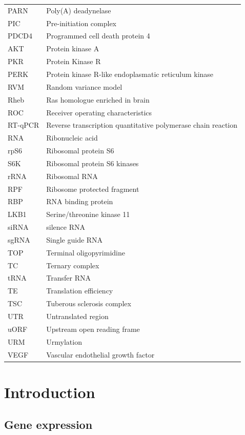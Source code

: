\documentclass[
  12pt,
  openany]{book}
\begin{document}
\begin{longtable}{ll}
PARN & Poly(A) deadynelase\\
PIC & Pre-initiation complex\\
PDCD4 & Programmed cell death protein 4\\
AKT & Protein kinase A\\
\addlinespace
PKR & Protein Kinase R\\
PERK & Protein kinase R-like endoplasmatic reticulum kinase\\
RVM & Random variance model\\
Rheb & Ras homologue enriched in brain\\
ROC & Receiver operating characteristics\\
\addlinespace
RT-qPCR & Reverse transcription quantitative polymerase chain
reaction\\
RNA & Ribonucleic acid\\
rpS6 & Ribosomal protein S6\\
S6K & Ribosomal protein S6 kinases\\
rRNA & Ribosomal RNA\\
\addlinespace
RPF & Ribosome protected fragment\\
RBP & RNA binding protein\\
LKB1 & Serine/threonine kinase 11\\
siRNA & silence RNA\\
sgRNA & Single guide RNA\\
\addlinespace
TOP & Terminal oligopyrimidine\\
TC & Ternary complex\\
tRNA & Transfer RNA\\
TE & Translation efficiency\\
TSC & Tuberous sclerosis complex\\
\addlinespace
UTR & Untranslated region\\
uORF & Upstream open reading frame\\
URM & Urmylation\\
VEGF & Vascular endothelial growth factor\\*
\end{longtable}
\clearpage
{}

\setcounter{page}{1}

\chapter{Introduction}
\section{Gene expression}
\end{document}

